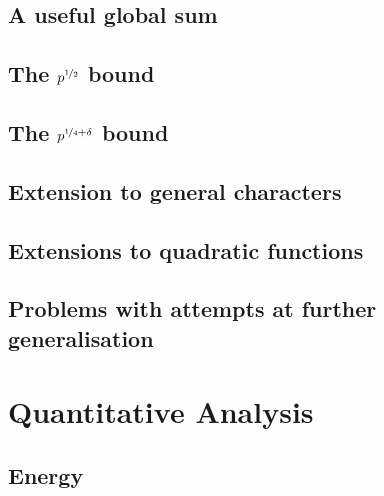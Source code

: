 \documentclass{report}
\begin{document}
\section{A useful global sum}
%
\section{The $p^{\nicefrac{1}{2}}$ bound}
%
\section{The $p^{\nicefrac{1}{4}+\delta}$ bound}
%
\section{Extension to general characters}
%
\section{Extensions to quadratic functions}
%
\section{Problems with attempts at further generalisation}
%
%
\chapter{Quantitative Analysis}
\section{Energy}
%
%
\end{document}
